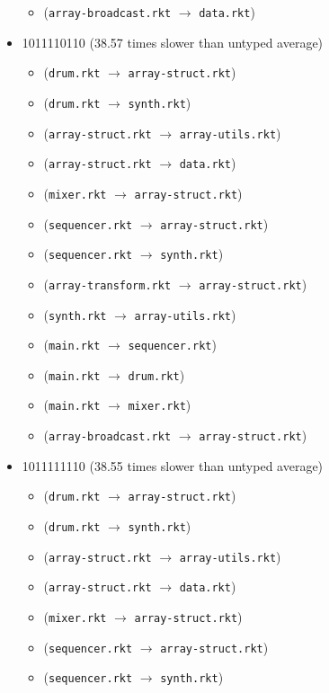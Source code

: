 \documentclass{article}
\newcommand{\mono}[1]{\texttt{#1}}
\begin{document}
\begin{itemize}
\begin{itemize}
  \item (\mono{array-broadcast.rkt} $\rightarrow$ \mono{data.rkt})
  \end{itemize}
\item 1011110110 (38.57 times slower than untyped average)
  \begin{itemize}
  \item (\mono{drum.rkt} $\rightarrow$ \mono{array-struct.rkt})
  \item (\mono{drum.rkt} $\rightarrow$ \mono{synth.rkt})
  \item (\mono{array-struct.rkt} $\rightarrow$ \mono{array-utils.rkt})
  \item (\mono{array-struct.rkt} $\rightarrow$ \mono{data.rkt})
  \item (\mono{mixer.rkt} $\rightarrow$ \mono{array-struct.rkt})
  \item (\mono{sequencer.rkt} $\rightarrow$ \mono{array-struct.rkt})
  \item (\mono{sequencer.rkt} $\rightarrow$ \mono{synth.rkt})
  \item (\mono{array-transform.rkt} $\rightarrow$ \mono{array-struct.rkt})
  \item (\mono{synth.rkt} $\rightarrow$ \mono{array-utils.rkt})
  \item (\mono{main.rkt} $\rightarrow$ \mono{sequencer.rkt})
  \item (\mono{main.rkt} $\rightarrow$ \mono{drum.rkt})
  \item (\mono{main.rkt} $\rightarrow$ \mono{mixer.rkt})
  \item (\mono{array-broadcast.rkt} $\rightarrow$ \mono{array-struct.rkt})
  \end{itemize}
\item 1011111110 (38.55 times slower than untyped average)
  \begin{itemize}
  \item (\mono{drum.rkt} $\rightarrow$ \mono{array-struct.rkt})
  \item (\mono{drum.rkt} $\rightarrow$ \mono{synth.rkt})
  \item (\mono{array-struct.rkt} $\rightarrow$ \mono{array-utils.rkt})
  \item (\mono{array-struct.rkt} $\rightarrow$ \mono{data.rkt})
  \item (\mono{mixer.rkt} $\rightarrow$ \mono{array-struct.rkt})
  \item (\mono{sequencer.rkt} $\rightarrow$ \mono{array-struct.rkt})
  \item (\mono{sequencer.rkt} $\rightarrow$ \mono{synth.rkt})

\end{itemize}
\end{itemize}
\end{document}

